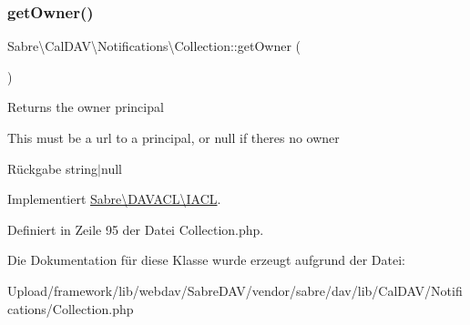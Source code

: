 \subsubsection{\texorpdfstring{get\+Owner()}{getOwner()}}
{\footnotesize\ttfamily Sabre\textbackslash{}\+Cal\+D\+A\+V\textbackslash{}\+Notifications\textbackslash{}\+Collection\+::get\+Owner (\begin{DoxyParamCaption}{ }\end{DoxyParamCaption})}

Returns the owner principal

This must be a url to a principal, or null if there\textquotesingle{}s no owner

\begin{DoxyReturn}{Rückgabe}
string$\vert$null 
\end{DoxyReturn}


Implementiert \mbox{\hyperlink{interface_sabre_1_1_d_a_v_a_c_l_1_1_i_a_c_l_a05f531b4ae1a86eab4e6e95b0413390e}{Sabre\textbackslash{}\+D\+A\+V\+A\+C\+L\textbackslash{}\+I\+A\+CL}}.



Definiert in Zeile 95 der Datei Collection.\+php.



Die Dokumentation für diese Klasse wurde erzeugt aufgrund der Datei\+:\begin{DoxyCompactItemize}
\item 
Upload/framework/lib/webdav/\+Sabre\+D\+A\+V/vendor/sabre/dav/lib/\+Cal\+D\+A\+V/\+Notifications/Collection.\+php\end{DoxyCompactItemize}
